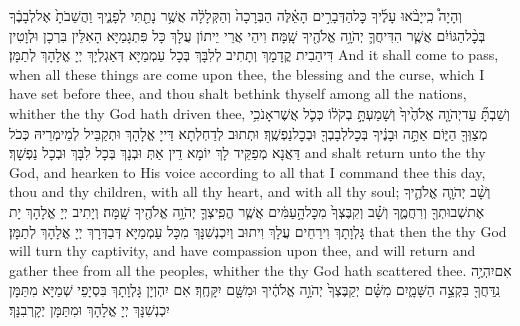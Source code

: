 \newperek
{}%
{וְהָיָה֩ כִֽי\maqqaf יָבֹ֨אוּ עָלֶ֜יךָ כׇּל\maqqaf הַדְּבָרִ֣ים הָאֵ֗לֶּה הַבְּרָכָה֙ וְהַקְּלָלָ֔ה אֲשֶׁ֥ר נָתַ֖תִּי לְפָנֶ֑יךָ וַהֲשֵׁבֹתָ֙ אֶל\maqqaf לְבָבֶ֔ךָ בְּכׇ֨ל\maqqaf הַגּוֹיִ֔ם אֲשֶׁ֧ר הִדִּיחֲךָ֛ יְהֹוָ֥ה אֱלֹהֶ֖יךָ שָֽׁמָּה׃}
{וִיהֵי אֲרֵי יֵיתוֹן עֲלָךְ כָּל פִּתְגָמַיָּא הָאִלֵּין בִּרְכָן וּלְוָטִין דִּיהַבִית קֳדָמָךְ וְתָתִיב לְלִבָּךְ בְּכָל עַמְמַיָּא דְּאַגְלְיָךְ יְיָ אֱלָהָךְ לְתַמָּן׃}
{And it shall come to pass, when all these things are come upon thee, the blessing and the curse, which I have set before thee, and thou shalt bethink thyself among all the nations, whither the \lord\space thy God hath driven thee,}{}
{וְשַׁבְתָּ֞ עַד\maqqaf יְהֹוָ֤ה אֱלֹהֶ֙יךָ֙ וְשָׁמַעְתָּ֣ בְקֹל֔וֹ כְּכֹ֛ל אֲשֶׁר\maqqaf אָנֹכִ֥י מְצַוְּךָ֖ הַיּ֑וֹם אַתָּ֣ה וּבָנֶ֔יךָ בְּכׇל\maqqaf לְבָבְךָ֖ וּבְכׇל\maqqaf נַפְשֶֽׁךָ׃}
{וּתְתוּב לְדַחְלְתָא דַּייָ אֱלָהָךְ וּתְקַבֵּיל לְמֵימְרֵיהּ כְּכֹל דַּאֲנָא מְפַקֵּיד לָךְ יוֹמָא דֵין אַתְּ וּבְנָךְ בְּכָל לִבָּךְ וּבְכָל נַפְשָׁךְ׃}
{and shalt return unto the \lord\space thy God, and hearken to His voice according to all that I command thee this day, thou and thy children, with all thy heart, and with all thy soul;}{}
{וְשָׁ֨ב יְהֹוָ֧ה אֱלֹהֶ֛יךָ אֶת\maqqaf שְׁבוּתְךָ֖ וְרִחֲמֶ֑ךָ וְשָׁ֗ב וְקִבֶּצְךָ֙ מִכׇּל\maqqaf הָ֣עַמִּ֔ים אֲשֶׁ֧ר הֱפִֽיצְךָ֛ יְהֹוָ֥ה אֱלֹהֶ֖יךָ שָֽׁמָּה׃}
{וְיָתִיב יְיָ אֱלָהָךְ יָת גָּלְוָתָךְ וִירַחֵים עֲלָךְ וִיתוּב וְיִכְנְשִׁנָּךְ מִכָּל עַמְמַיָּא דְּבַדְּרָךְ יְיָ אֱלָהָךְ לְתַמָּן׃}
{that then the \lord\space thy God will turn thy captivity, and have compassion upon thee, and will return and gather thee from all the peoples, whither the \lord\space thy God hath scattered thee.}{}
{אִם\maqqaf יִהְיֶ֥ה נִֽדַּחֲךָ֖ בִּקְצֵ֣ה הַשָּׁמָ֑יִם מִשָּׁ֗ם יְקַבֶּצְךָ֙ יְהֹוָ֣ה אֱלֹהֶ֔יךָ וּמִשָּׁ֖ם יִקָּחֶֽךָ׃}
{אִם יִהְוְיָן גָּלְוָתָךְ בִּסְיָפֵי שְׁמַיָּא מִתַּמָּן יִכְנְשִׁנָּךְ יְיָ אֱלָהָךְ וּמִתַּמָּן יְקָרְבִנָּךְ׃}
